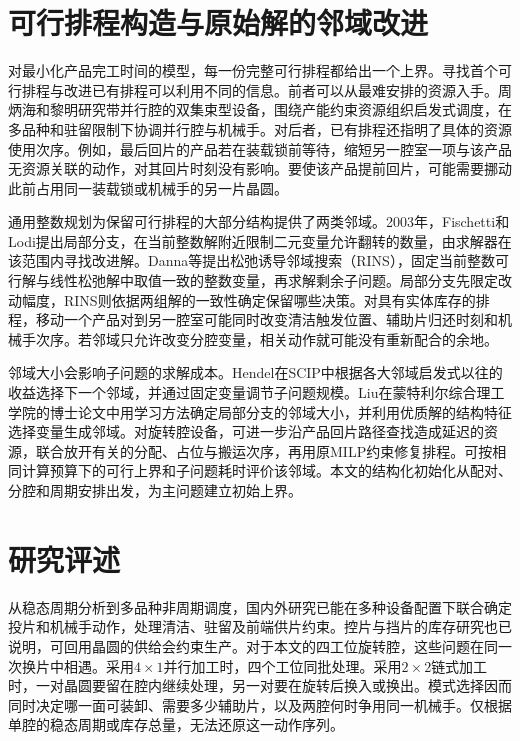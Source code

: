 \section{可行排程构造与原始解的邻域改进}

对最小化产品完工时间的模型，每一份完整可行排程都给出一个上界。寻找首个可行排程与改进已有排程可以利用不同的信息。前者可以从最难安排的资源入手。周炳海和黎明研究带并行腔的双集束型设备，围绕产能约束资源组织启发式调度，在多品种和驻留限制下协调并行腔与机械手\citep{zhou2016ccr}。对后者，已有排程还指明了具体的资源使用次序。例如，最后回片的产品若在装载锁前等待，缩短另一腔室一项与该产品无资源关联的动作，对其回片时刻没有影响。要使该产品提前回片，可能需要挪动此前占用同一装载锁或机械手的另一片晶圆。

通用整数规划为保留可行排程的大部分结构提供了两类邻域。2003年，Fischetti和Lodi提出局部分支，在当前整数解附近限制二元变量允许翻转的数量，由求解器在该范围内寻找改进解\citep{fischetti2003local}。Danna等提出松弛诱导邻域搜索（RINS），固定当前整数可行解与线性松弛解中取值一致的整数变量，再求解剩余子问题\citep{danna2005rins}。局部分支先限定改动幅度，RINS则依据两组解的一致性确定保留哪些决策。对具有实体库存的排程，移动一个产品对到另一腔室可能同时改变清洁触发位置、辅助片归还时刻和机械手次序。若邻域只允许改变分腔变量，相关动作就可能没有重新配合的余地。

邻域大小会影响子问题的求解成本。Hendel在SCIP中根据各大邻域启发式以往的收益选择下一个邻域，并通过固定变量调节子问题规模\citep{hendel2022alns}。Liu在蒙特利尔综合理工学院的博士论文中用学习方法确定局部分支的邻域大小，并利用优质解的结构特征选择变量生成邻域\citep{liu2022thesis}。对旋转腔设备，可进一步沿产品回片路径查找造成延迟的资源，联合放开有关的分配、占位与搬运次序，再用原MILP约束修复排程。可按相同计算预算下的可行上界和子问题耗时评价该邻域。本文的结构化初始化从配对、分腔和周期安排出发，为主问题建立初始上界。

\section{研究评述}

从稳态周期分析到多品种非周期调度，国内外研究已能在多种设备配置下联合确定投片和机械手动作，处理清洁、驻留及前端供片约束。控片与挡片的库存研究也已说明，可回用晶圆的供给会约束生产。对于本文的四工位旋转腔，这些问题在同一次换片中相遇。采用$4\times1$并行加工时，四个工位同批处理。采用$2\times2$链式加工时，一对晶圆要留在腔内继续处理，另一对要在旋转后换入或换出。模式选择因而同时决定哪一面可装卸、需要多少辅助片，以及两腔何时争用同一机械手。仅根据单腔的稳态周期或库存总量，无法还原这一动作序列。

